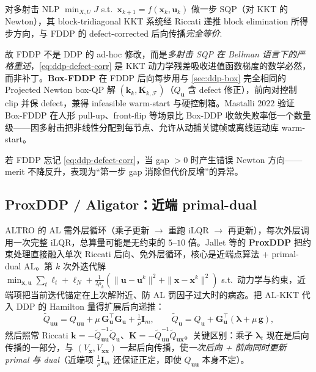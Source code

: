 \begin{theorem}[FDDP $=$ 多射击 SQP 的 condensed Riccati（Mastalli $2020$ Prop.\ 2）]
\label{thm:ddp-fddp-sqp}
对多射击 NLP $\min_{X,U}J$ s.t.\ $\mathbf{x}_{k+1}=f(\mathbf{x}_k,\mathbf{u}_k)$ 做一步 SQP（对 KKT 的 Newton），其 block-tridiagonal KKT 系统经 Riccati 递推 block elimination 所得步方向，与 FDDP 的 defect-corrected 后向传播\emph{完全等价}\cite{mastalli2020crocoddyl}.
\end{theorem}

故 FDDP 不是 DDP 的 ad-hoc 修改，而是\emph{多射击 SQP 在 Bellman 语言下的严格重述}，\cref{eq:ddp-defect-corr} 是 KKT 动力学残差吸收进值函数梯度的数学必然，而非补丁。\textbf{Box-FDDP} 在 FDDP 后向每步用与 \cref{sec:ddp-box} 完全相同的 Projected Newton box-QP 解 $(\mathbf{k}_k,\mathbf{K}_{k,\mathcal{F}})$（$Q_{\mathbf{u}}$ 含 defect 修正），前向对控制 clip 并保 defect，兼得 infeasible warm-start 与硬控制箱\cite{mastalli2022boxfddp}。Mastalli $2022$ 验证 Box-FDDP 在人形 pull-up、front-flip 等场景比 Box-DDP 收敛失败率低一个数量级——因多射击把非线性分配到每节点、允许从动捕关键帧或离线运动库 warm-start。

\begin{pitfall}[漏掉 defect 修正]
若 FDDP 忘记 \cref{eq:ddp-defect-corr}，当 gap $>0$ 时产生错误 Newton 方向——merit 不降反升，表现为“第一步 gap 消除但代价反增”的异常。
\end{pitfall}

\subsection{ProxDDP / Aligator：近端 primal-dual}
\label{sec:ddp-proxddp}

ALTRO 的 AL 需外层循环（乘子更新 $\to$ 重跑 iLQR $\to$ 再更新），每次外层调用一次完整 iLQR，总算量可能是无约束的 $5$--$10$ 倍。Jallet 等的 \textbf{ProxDDP} 把约束处理直接融入单次 Riccati 后向、免外层循环\cite{jallet2025proxddp}，核心是近端点算法 + primal-dual AL。第 $k$ 次外迭代解 $\min_{\mathbf{x},\mathbf{u}}\sum_t\ell_t+\ell_N+\tfrac1{2\rho_k}(\|\mathbf{u}-\mathbf{u}^k\|^2+\|\mathbf{x}-\mathbf{x}^k\|^2)$ s.t.\ 动力学与约束，近端项把当前迭代锚定在上次解附近、防 AL 罚因子过大时的病态。把 AL-KKT 代入 DDP 的 Hamilton 量得扩展后向递推：
\begin{equation}
  \tilde Q_{\mathbf{uu}}=Q_{\mathbf{uu}}+\mu\,\mathbf{G}_{\mathbf{u}}^\top\mathbf{G}_{\mathbf{u}}+\tfrac1\rho\mathbf{I}_m,\qquad
  \tilde Q_{\mathbf{u}}=Q_{\mathbf{u}}+\mathbf{G}_{\mathbf{u}}^\top(\boldsymbol{\lambda}+\mu\,\mathbf{g}),
  \label{eq:ddp-prox-Q}
\end{equation}
然后照常 Riccati $\mathbf{k}=-\tilde Q_{\mathbf{uu}}^{-1}\tilde Q_{\mathbf{u}}$、$\mathbf{K}=-\tilde Q_{\mathbf{uu}}^{-1}\tilde Q_{\mathbf{ux}}$。关键区别：乘子 $\boldsymbol{\lambda}_t$ 现在是后向传播的一部分，与 $(V_{\mathbf{x}},V_{\mathbf{xx}})$ 一起后向传播，使\emph{一次后向 + 前向同时更新 primal 与 dual}（近端项 $\tfrac1\rho\mathbf{I}_m$ 还保证正定，即使 $Q_{\mathbf{uu}}$ 本身不定）。

